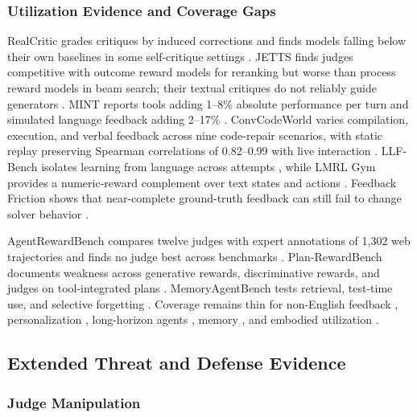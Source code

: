 \subsubsection{Utilization Evidence and Coverage Gaps}
\label{supp:evaluation-utilization}

RealCritic grades critiques by induced corrections and finds models falling below their own baselines in some self-critique settings \citep{tang2025realcritic}. JETTS finds judges competitive with outcome reward models for reranking but worse than process reward models in beam search; their textual critiques do not reliably guide generators \citep{zhou2025evaluating}. MINT reports tools adding 1--8\% absolute performance per turn and simulated language feedback adding 2--17\% \citep{wang2023mint}. ConvCodeWorld varies compilation, execution, and verbal feedback across nine code-repair scenarios, with static replay preserving Spearman correlations of 0.82--0.99 with live interaction \citep{han2025convcodeworld}. LLF-Bench isolates learning from language across attempts \citep{cheng2023llfbench}, while LMRL Gym provides a numeric-reward complement over text states and actions \citep{abdulhai2023lmrl}. Feedback Friction shows that near-complete ground-truth feedback can still fail to change solver behavior \citep{jiang2025feedback}.

AgentRewardBench compares twelve judges with expert annotations of 1,302 web trajectories and finds no judge best across benchmarks \citep{lu2025agentrewardbench}. Plan-RewardBench documents weakness across generative rewards, discriminative rewards, and judges on tool-integrated plans \citep{wang2026aligning}. MemoryAgentBench tests retrieval, test-time use, and selective forgetting \citep{hu2025evaluating}. Coverage remains thin for non-English feedback \citep{son2024mmeval}, personalization \citep{ma2026personalized}, long-horizon agents \citep{wang2026aligning}, memory \citep{hu2025evaluating}, and embodied utilization \citep{wybitul2024vista,hwang2024motif,lee2026roboreward}.

\subsection{Extended Threat and Defense Evidence}
\label{supp:safety-evidence}

\subsubsection{Judge Manipulation}
\label{supp:safety-judge-attacks}

